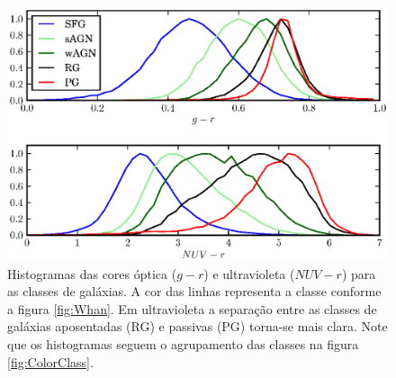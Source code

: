 \begin{figure}
	\includegraphics{figuras/histo_galtype_color.eps}
	\caption[Histogramas de cores para as classes de galáxias.]
	{Histogramas das cores óptica ($g-r$) e ultravioleta ($NUV-r$) para as
	classes de galáxias. A cor das linhas representa a classe conforme a figura
	\ref{fig:Whan}. Em ultravioleta a separação entre as classes de galáxias
	aposentadas (RG) e passivas (PG) torna-se mais clara. Note que os histogramas
	seguem o agrupamento das classes na figura \ref{fig:ColorClass}.}
	\label{fig:HistogramaCorClasse}
\end{figure}

